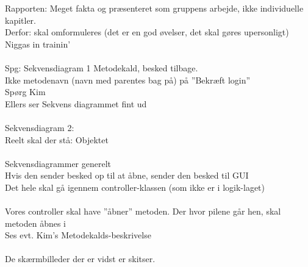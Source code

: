 Rapporten: Meget fakta og præsenteret som gruppens arbejde, ikke individuelle kapitler.\\
	Derfor: skal omformuleres (det er en god øvelser, det skal gøres upersonligt)
	Niggas in trainin’
\\
\\
Spg: Sekvensdiagram 1
	Metodekald, besked tilbage.	\\
Ikke metodenavn (navn med parentes bag på) på ”Bekræft login”\\
Spørg Kim\\
Ellers ser Sekvens diagrammet fint ud
\\
\\

Sekvensdiagram 2:\\
	Reelt skal der stå: Objektet
\\
\\
Sekvensdiagrammer generelt\\
	Hvis den sender besked op til at åbne, sender den besked til GUI\\
	Det hele skal gå igennem controller-klassen (som ikke er i logik-laget)
\\
\\

Vores controller skal have ”åbner” metoden.
Der hvor pilene går hen, skal metoden åbnes i\\
Ses evt. Kim’s Metodekalds-beskrivelse
\\
\\

De skærmbilleder der er vidst er skitser.
